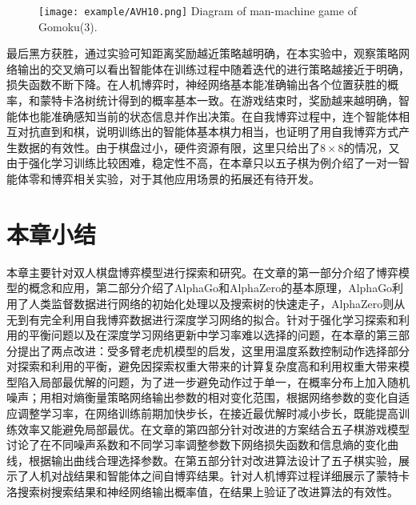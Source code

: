 \begin{figure}[htbp]
	\centering
	\texttt{[image: example/AVH10.png]}
	\hspace{0.5cm}
	{Diagram of man-machine game of Gomoku(3).}
	\label{fig:human6}
\end{figure}


最后黑方获胜，通过实验可知距离奖励越近策略越明确，在本实验中，观察策略网络输出的交叉熵可以看出智能体在训练过程中随着迭代的进行策略越接近于明确，损失函数不断下降。在人机博弈时，神经网络基本能准确输出各个位置获胜的概率，和蒙特卡洛树统计得到的概率基本一致。在游戏结束时，奖励越来越明确，智能体也能准确感知当前的状态信息并作出决策。在自我博弈过程中，连个智能体相互对抗直到和棋，说明训练出的智能体基本棋力相当，也证明了用自我博弈方式产生数据的有效性。由于棋盘过小，硬件资源有限，这里只给出了$8 \times 8$的情况，又由于强化学习训练比较困难，稳定性不高，在本章只以五子棋为例介绍了一对一智能体零和博弈相关实验，对于其他应用场景的拓展还有待开发。

\section{本章小结}

本章主要针对双人棋盘博弈模型进行探索和研究。在文章的第一部分介绍了博弈模型的概念和应用，第二部分介绍了AlphaGo和AlphaZero的基本原理，AlphaGo利用了人类监督数据进行网络的初始化处理以及搜索树的快速走子，AlphaZero则从无到有完全利用自我博弈数据进行深度学习网络的拟合。针对于强化学习探索和利用的平衡问题以及在深度学习网络更新中学习率难以选择的问题，在本章的第三部分提出了两点改进：受多臂老虎机模型的启发，这里用温度系数控制动作选择部分对探索和利用的平衡，避免因探索权重大带来的计算复杂度高和利用权重大带来模型陷入局部最优解的问题，为了进一步避免动作过于单一，在概率分布上加入随机噪声；用相对熵衡量策略网络输出参数的相对变化范围，根据网络参数的变化自适应调整学习率，在网络训练前期加快步长，在接近最优解时减小步长，既能提高训练效率又能避免局部最优。在文章的第四部分针对改进的方案结合五子棋游戏模型讨论了在不同噪声系数和不同学习率调整参数下网络损失函数和信息熵的变化曲线，根据输出曲线合理选择参数。在第五部分针对改进算法设计了五子棋实验，展示了人机对战结果和智能体之间自博弈结果。针对人机博弈过程详细展示了蒙特卡洛搜索树搜索结果和神经网络输出概率值，在结果上验证了改进算法的有效性。